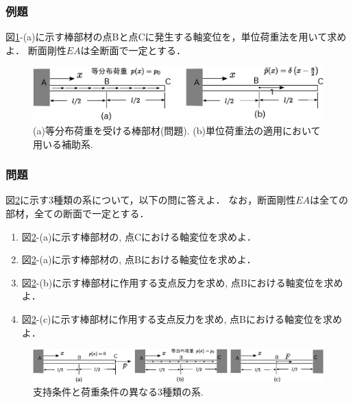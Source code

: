 \documentclass[10pt,a4j]{jarticle}
\begin{document}
\subsubsection{例題}
図\ref{fig:fig1_4}-(a)に示す棒部材の点Bと点Cに発生する軸変位を，単位荷重法を用いて求めよ．
断面剛性$EA$は全断面で一定とする．
\begin{figure}[h]
	\begin{center}
	\includegraphics[width=0.8\linewidth]{fig1_4.eps} 
	\end{center}
	\caption{(a)等分布荷重を受ける棒部材(問題). (b)単位荷重法の適用において用いる補助系.} 
	\label{fig:fig1_4}
\end{figure}
\subsubsection{問題}
図\ref{fig:fig1_5}に示す3種類の系について，以下の問に答えよ．
なお，断面剛性$EA$は全ての部材，全ての断面で一定とする．
\begin{enumerate}
\item
	図\ref{fig:fig1_5}-(a)に示す棒部材の, 点Cにおける軸変位を求めよ．
\item
	図\ref{fig:fig1_5}-(a)に示す棒部材の, 点Bにおける軸変位を求めよ．
\item
	図\ref{fig:fig1_5}-(b)に示す棒部材に作用する支点反力を求め, 点Bにおける軸変位を求めよ．
\item
	図\ref{fig:fig1_5}-(c)に示す棒部材に作用する支点反力を求め, 点Bにおける軸変位を求めよ．
\end{enumerate}
\begin{figure}[h]
	\begin{center}
	\includegraphics[width=1.0\linewidth]{fig1_5.eps} 
	\end{center}
	\caption{支持条件と荷重条件の異なる3種類の系.} 
	\label{fig:fig1_5}
\end{figure}
\end{document}

